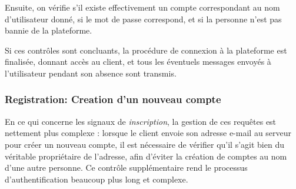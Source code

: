 \documentclass[12pt]{report}
\begin{document}
	Ensuite, on vérifie s’il existe effectivement un compte correspondant au nom d’utilisateur donné, si le mot de passe correspond, et si la personne n’est pas bannie de la plateforme.
	
	Si ces contrôles sont concluants, la procédure de connexion à la plateforme est finalisée, donnant accès au client, et tous les éventuels messages envoyés à l’utilisateur pendant son absence sont transmis.
	
	\subsubsection{Registration: Creation d'un nouveau compte}
	
	En ce qui concerne les signaux de \textit{inscription}, la gestion de ces requêtes est nettement plus complexe : lorsque le client envoie son adresse e-mail au serveur pour créer un nouveau compte, il est nécessaire de vérifier qu’il s’agit bien du véritable propriétaire de l’adresse, afin d’éviter la création de comptes au nom d’une autre personne. Ce contrôle supplémentaire rend le processus d’authentification beaucoup plus long et complexe.
	
\end{document}
